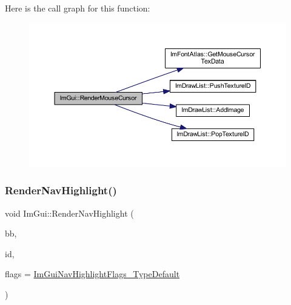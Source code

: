 Here is the call graph for this function\+:
\nopagebreak
\begin{figure}[H]
\begin{center}
\leavevmode
\includegraphics[width=350pt]{namespace_im_gui_a01dc52b1969c6b3ae52fdd3228b377ad_cgraph}
\end{center}
\end{figure}
\mbox{\label{namespace_im_gui_afc84af0481214603f058b6ee31d20855}} 
\subsubsection{\texorpdfstring{Render\+Nav\+Highlight()}{RenderNavHighlight()}}
{\footnotesize\ttfamily void Im\+Gui\+::\+Render\+Nav\+Highlight (\begin{DoxyParamCaption}\item[{const \mbox{\hyperlink{struct_im_rect}{Im\+Rect}} \&}]{bb,  }\item[{\mbox{\hyperlink{imgui_8h_a1785c9b6f4e16406764a85f32582236f}{Im\+Gui\+ID}}}]{id,  }\item[{\mbox{\hyperlink{imgui__internal_8h_a8c2855ba575756109c607c10697bcccd}{Im\+Gui\+Nav\+Highlight\+Flags}}}]{flags = {\ttfamily \mbox{\hyperlink{imgui__internal_8h_a55ae92b6fb7a0edbe4814f6e261d9e26ae54860a6f56817772ef7f1f42ca3c1bd}{Im\+Gui\+Nav\+Highlight\+Flags\+\_\+\+Type\+Default}}} }\end{DoxyParamCaption})}


